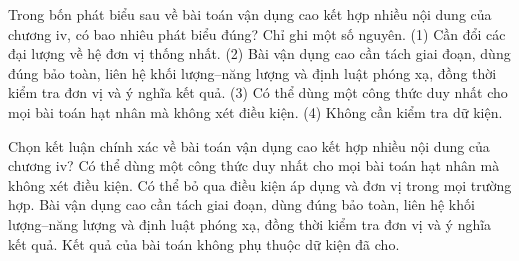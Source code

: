\begin{ex}
Trong bốn phát biểu sau về bài toán vận dụng cao kết hợp nhiều nội dung của chương iv, có bao nhiêu phát biểu đúng? Chỉ ghi một số nguyên. (1) Cần đổi các đại lượng về hệ đơn vị thống nhất. (2) Bài vận dụng cao cần tách giai đoạn, dùng đúng bảo toàn, liên hệ khối lượng–năng lượng và định luật phóng xạ, đồng thời kiểm tra đơn vị và ý nghĩa kết quả. (3) Có thể dùng một công thức duy nhất cho mọi bài toán hạt nhân mà không xét điều kiện. (4) Không cần kiểm tra dữ kiện.
\end{ex}

\begin{ex}
Chọn kết luận chính xác về bài toán vận dụng cao kết hợp nhiều nội dung của chương iv?
\choice
{Có thể dùng một công thức duy nhất cho mọi bài toán hạt nhân mà không xét điều kiện.}
{Có thể bỏ qua điều kiện áp dụng và đơn vị trong mọi trường hợp.}
{\True Bài vận dụng cao cần tách giai đoạn, dùng đúng bảo toàn, liên hệ khối lượng–năng lượng và định luật phóng xạ, đồng thời kiểm tra đơn vị và ý nghĩa kết quả.}
{Kết quả của bài toán không phụ thuộc dữ kiện đã cho.}
\end{ex}


